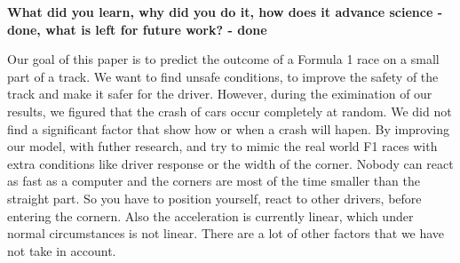 \textbf{What did you learn, why did you do it, how does it advance science - done, what is left for future work? - done}

Our goal of this paper is to predict the outcome of a Formula 1 race on a small part of a track. We want to find unsafe conditions, to improve the safety of the track and make it safer for the driver. However, during the eximination of our results, we figured that the crash of cars occur completely at random. We did not find a significant factor that show how or when a crash will hapen. By improving our model, with futher research, and try to mimic the real world F1 races with extra conditions like driver response or the width of the corner. Nobody can react as fast as a computer and the corners are most of the time smaller than the straight part. So you have to position yourself, react to other drivers, before entering the cornern. Also the acceleration is currently linear, which under normal circumstances is not linear. There are a lot of other factors that we have not take in account.

